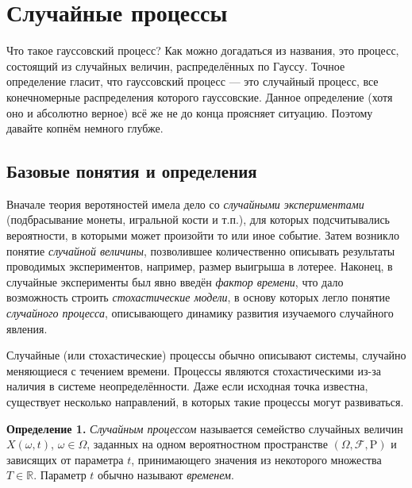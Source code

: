 \documentclass[11pt,a4paper]{article}
\begin{document}
    \hypertarget{ux441ux43bux443ux447ux430ux439ux43dux44bux435-ux43fux440ux43eux446ux435ux441ux441ux44b}{%
\section{Случайные
процессы}\label{ux441ux43bux443ux447ux430ux439ux43dux44bux435-ux43fux440ux43eux446ux435ux441ux441ux44b}}

Что такое гауссовский процесс? Как можно догадаться из названия, это
процесс, состоящий из случайных величин, распределённых по Гауссу.
Точное определение гласит, что гауссовский процесс --- это случайный
процесс, все конечномерные распределения которого гауссовские. Данное
определение (хотя оно и абсолютно верное) всё же не до конца проясняет
ситуацию. Поэтому давайте копнём немного глубже.

    \hypertarget{ux431ux430ux437ux43eux432ux44bux435-ux43fux43eux43dux44fux442ux438ux44f-ux438-ux43eux43fux440ux435ux434ux435ux43bux435ux43dux438ux44f}{%
\subsection{Базовые понятия и
определения}\label{ux431ux430ux437ux43eux432ux44bux435-ux43fux43eux43dux44fux442ux438ux44f-ux438-ux43eux43fux440ux435ux434ux435ux43bux435ux43dux438ux44f}}

Вначале теория веротяностей имела дело со \emph{случайными
экспериментами} (подбрасывание монеты, игральной кости и т.п.), для
которых подсчитывались вероятности, в которыми может произойти то или
иное событие. Затем возникло понятие \emph{случайной величины},
позволившее количественно описывать результаты проводимых экспериментов,
например, размер выигрыша в лотерее. Наконец, в случайные эксперименты
был явно введён \emph{фактор времени}, что дало возможность строить
\emph{стохастические модели}, в основу которых легло понятие
\emph{случайного процесса}, описывающего динамику развития изучаемого
случайного явления.

Случайные (или стохастические) процессы обычно описывают системы,
случайно меняющиеся с течением времени. Процессы являются
стохастическими из-за наличия в системе неопределённости. Даже если
исходная точка известна, существует несколько направлений, в которых
такие процессы могут развиваться.

\textbf{Определение 1.} \emph{Случайным процессом} называется семейство
случайных величин \(X(\omega, t)\), \(\omega \in \Omega\), заданных на
одном вероятностном пространстве \((\Omega, \mathcal{F}, \mathrm{P})\) и
зависящих от параметра \(t\), принимающего значения из некоторого
множества \(T \in \mathbb{R}\). Параметр \(t\) обычно называют
\emph{временем}.
\end{document}
